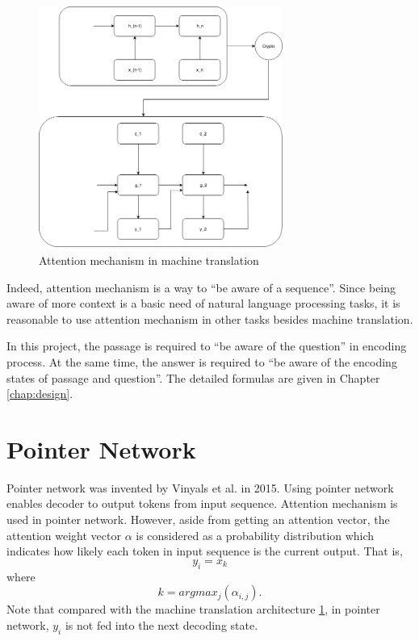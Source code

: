 \documentclass[modernstyle,12pt]{sjsuthesis}
\theoremstyle{definition}
\begin{document}
\begin{figure}[htbp]\centering
  \includegraphics[width=8cm, height=8cm]{figures/attention}
  \caption{Attention mechanism in machine translation}
  \label{f:attention}
\end{figure}



Indeed, attention mechanism is a way to ``be aware of a sequence''. Since being aware of more context is a basic need of natural language processing tasks, it is reasonable to use attention mechanism in other tasks besides machine translation.

In this project, the passage is required to ``be aware of the question'' in encoding process. At the same time, the answer is required to ``be aware of the encoding states of passage and question''. The detailed formulas are given in Chapter \ref{chap:design}.




\section{Pointer Network}\label{sect:pointerNet}

Pointer network\cite{vinyals2015pointer} was invented by Vinyals et al. in 2015. Using pointer network enables decoder to output tokens from input sequence. Attention mechanism is used in pointer network. However, aside from getting an attention vector, the attention weight vector $\alpha$ is considered as a probability distribution which indicates how likely each token in input sequence is the current output. That is,
$$y_i = x_k$$
where
$$k = argmax_j(\alpha _{i,j}).$$
Note that compared with the machine translation architecture \ref{f:attention}, in pointer network, $y_i$ is not fed into the next decoding state.
\end{document}
